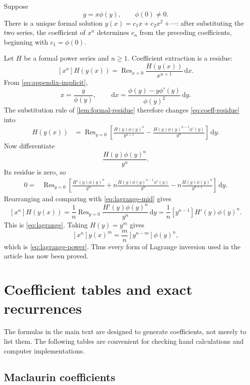 \documentclass[11pt]{article}
\theoremstyle{remark}
\newcommand{\Res}{\operatorname{Res}}
\newcommand{\dd}{\,\mathrm d}
\begin{document}
Suppose
\begin{equation}\label{eq:appendix-implicit}
       y=x\phi(y),\qquad \phi(0)\neq0.
\end{equation}
There is a unique formal solution \(y(x)=c_1x+c_2x^2+\cdots\): after
substituting the two series, the coefficient of \(x^n\) determines \(c_n\)
from the preceding coefficients, beginning with \(c_1=\phi(0)\).

Let \(H\) be a formal power series and \(n\geq1\).  Coefficient extraction
is a residue:
\begin{equation}\label{eq:coeff-residue}
       [x^n]H(y(x))
       =\Res_{x=0}\frac{H(y(x))}{x^{n+1}}\dd x.
\end{equation}
From \eqref{eq:appendix-implicit},
\[
       x=\frac{y}{\phi(y)},
       \qquad
       \dd x=\frac{\phi(y)-y\phi'(y)}{\phi(y)^2}\dd y.
\]
The substitution rule of \cref{lem:formal-residue} therefore changes
\eqref{eq:coeff-residue} into
\begin{align}
 [x^n]H(y(x))
 &=\Res_{y=0}
 \left[
 \frac{H(y)\phi(y)^n}{y^{n+1}}
 -\frac{H(y)\phi(y)^{n-1}\phi'(y)}{y^n}
 \right]\dd y.
 \label{eq:lagrange-mid}
\end{align}
Now differentiate
\[
       \frac{H(y)\phi(y)^n}{y^n}.
\]
Its residue is zero, so
\begin{align*}
 0={}&\Res_{y=0}\left[
 \frac{H'(y)\phi(y)^n}{y^n}
 +n\frac{H(y)\phi(y)^{n-1}\phi'(y)}{y^n}
 -n\frac{H(y)\phi(y)^n}{y^{n+1}}
 \right]\dd y.
\end{align*}
Rearranging and comparing with \eqref{eq:lagrange-mid} gives
\[
 [x^n]H(y(x))
 =\frac1n\Res_{y=0}
       \frac{H'(y)\phi(y)^n}{y^n}\dd y
 =\frac1n[y^{n-1}]H'(y)\phi(y)^n.
\]
This is \eqref{eq:lagrange}.  Taking \(H(y)=y^m\) gives
\[
 [x^n]y(x)^m
 =\frac{m}{n}[y^{n-m}]\phi(y)^n,
\]
which is \eqref{eq:lagrange-power}.  Thus every form of Lagrange inversion
used in the article has now been proved.

\section{Coefficient tables and exact recurrences}\label{app:coefficients}

The formulas in the main text are designed to generate coefficients, not
merely to list them.  The following tables are convenient for checking hand
calculations and computer implementations.

\subsection{Maclaurin coefficients}
\end{document}
